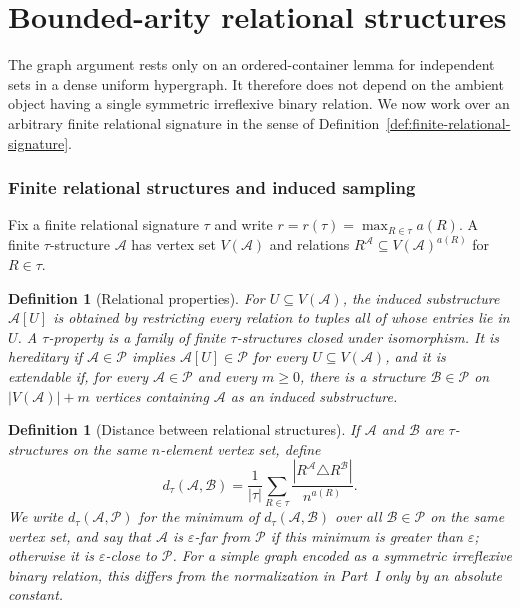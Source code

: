 \documentclass[11pt,reqno,letterpaper]{amsart}
\newcommand{\cA}{{\mathcal A}}
\newcommand{\cB}{{\mathcal B}}
\newcommand{\cP}{{\mathcal P}}
\theoremstyle{plain}
\newtheorem{defn}[thm]{Definition}
\theoremstyle{remark}
\begin{document}
\part{Bounded-arity relational structures}

The graph argument rests only on an ordered-container lemma for independent
sets in a dense uniform hypergraph.  It therefore does not depend on the
ambient object having a single symmetric irreflexive binary relation.  We now
work over an arbitrary finite relational signature in the sense of
Definition~\ref{def:finite-relational-signature}.

\section{Finite relational structures and induced sampling}
\label{sec:relational-preliminaries}

Fix a finite relational signature $\tau$ and write
$r=r(\tau)=\max_{R\in\tau}a(R)$.  A finite $\tau$-structure $\cA$ has vertex set
$V(\cA)$ and relations $R^{\cA}\subseteq V(\cA)^{a(R)}$ for $R\in\tau$.

\begin{defn}[Relational properties]
For $U\subseteq V(\cA)$, the \textit{induced substructure} $\cA[U]$ is obtained
by restricting every relation to tuples all of whose entries lie in $U$.  A
$\tau$-property is a family of finite $\tau$-structures closed under
isomorphism.  It is \textit{hereditary} if $\cA\in\cP$ implies
$\cA[U]\in\cP$ for every $U\subseteq V(\cA)$, and it is \textit{extendable} if,
for every $\cA\in\cP$ and every $m\geq0$, there is a structure $\cB\in\cP$ on
$|V(\cA)|+m$ vertices containing $\cA$ as an induced substructure.
\end{defn}

\begin{defn}[Distance between relational structures]
If $\cA$ and $\cB$ are $\tau$-structures on the same $n$-element vertex set,
define
\begin{equation}
\label{eq:relational-distance}
d_\tau(\cA,\cB)
=\frac1{|\tau|}\sum_{R\in\tau}
\frac{|R^{\cA}\triangle R^{\cB}|}{n^{a(R)}}.
\end{equation}
We write $d_\tau(\cA,\cP)$ for the minimum of $d_\tau(\cA,\cB)$ over all
$\cB\in\cP$ on the same vertex set, and say that $\cA$ is
\textit{$\varepsilon$-far from $\cP$} if this minimum is greater than
$\varepsilon$; otherwise it is \textit{$\varepsilon$-close to $\cP$}.  For a
simple graph encoded as a symmetric irreflexive binary relation, this differs
from the normalization in Part~I only by an absolute constant.
\end{defn}
\end{document}
